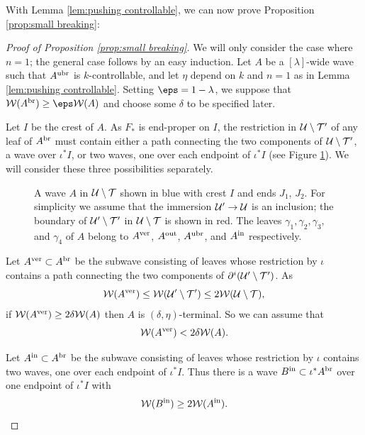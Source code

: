 \documentclass[12pt]{amsart}
\begin{document}
With Lemma \ref{lem:pushing controllable}, we can now prove Proposition \ref{prop:small breaking}:

\begin{proof}[Proof of Proposition \ref{prop:small breaking}]
	We will only consider the case where $n = 1$; the general case follows by an easy induction. 
	Let $A$ be a $[\lambda]$-wide wave such that  $A^{\mathrm{ubr}}$ is $k$-controllable, and let 
	$\eta$ depend on $k$ and $n =1$ as in Lemma \ref{lem:pushing controllable}.
	Setting $\eps= 1-\lambda$, we suppose that $\WW(A^\br)\geq \eps\WW(A)$ and choose some $\delta$ to be specified later. 
	
	Let $I$ be the crest of $A$.  
	As $F_*$ is end-proper on $I$, the restriction in $\mathcal U\setminus \mathcal T'$ of any leaf of $A^{\mathrm{br}}$ must  contain either a path connecting the two components of $\mathcal U\setminus \mathcal T'$, a wave over $\iota^*I$, or two waves, one over each endpoint of $\iota^*I$ (see Figure \ref{fig:breaking}). We will consider these three possibilities separately. 
	
	\begin{figure}
		\begin{center}
			\def\svgwidth{5in}
			
			\caption{A wave $A$ in $\mathcal U\setminus \mathcal T$ shown in blue with crest $I$ and ends $J_1$, $J_2$. For simplicity we assume that the immersion $\mathcal U'\to \mathcal U$ is an inclusion; the boundary of $\mathcal U'\setminus \mathcal T'$ in $\mathcal U\setminus \mathcal T$ is shown in red. The leaves $\gamma_1, \gamma_2, \gamma_3,$ and $\gamma_4$ of $A$ belong to $A^{\mathrm{ver}}$, $A^{\mathrm{out}}$, $A^{\mathrm{ubr}}$, and $A^{\mathrm{in}}$ respectively.}
			\label{fig:breaking}
		\end{center}
	\end{figure}
	
	
	Let $A^{\mathrm{ver}}\subset A^{\mathrm{br}}$ be the subwave consisting of leaves whose restriction by $\iota$ contains a path connecting the two components of $\partial^i (\mathcal U'\setminus \mathcal T')$.  
	As 
	$$\mathcal W(A^{\mathrm{ver}})\leq \mathcal W(\mathcal U'\setminus \mathcal T')\leq 2\mathcal W(\mathcal U\setminus \mathcal T),$$
	if $\mathcal W(A^{\mathrm{ver}})\geq 2\delta \mathcal W(A)$ then $A$ is $(\delta, \eta)$-terminal. 
	So we can  assume that  
	\begin{equation}\label{eq:vert}
		\mathcal W(A^{\mathrm{ver}})< 2\delta \mathcal W(A).
	\end{equation}
	
	
	
	
	Let $A^{\mathrm{in}}\subset A^{\mathrm{br}}$ be the subwave consisting of leaves whose restriction by $\iota$  contains two waves, one over each endpoint of $\iota^*I$. 
	Thus there is a wave $B^{\mathrm{in}}\subset \iota^*A^{\mathrm{br}}$ over one endpoint of 
	$\iota^*I$ with 
	\begin{equation}\label{eq:inbr}
		\mathcal W(B^{{\mathrm{in}}})\geq 2\mathcal W(A^{\mathrm{in}}).
	\end{equation}
	

\end{proof}
\end{document}
